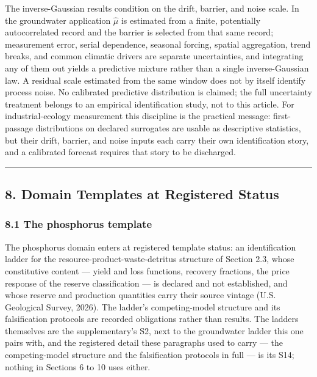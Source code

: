 \documentclass[11pt]{article}
\begin{document}
The inverse-Gaussian results condition on the drift, barrier, and noise
scale. In the groundwater application \(\widehat\mu\) is estimated from
a finite, potentially autocorrelated record and the barrier is selected
from that same record; measurement error, serial dependence, seasonal
forcing, spatial aggregation, trend breaks, and common climatic drivers
are separate uncertainties, and integrating any of them out yields a
predictive mixture rather than a single inverse-Gaussian law. A residual
scale estimated from the same window does not by itself identify process
noise. No calibrated predictive distribution is claimed; the full
uncertainty treatment belongs to an empirical identification study, not
to this article. For industrial-ecology measurement this discipline is
the practical message: first-passage distributions on declared
surrogates are usable as descriptive statistics, but their drift,
barrier, and noise inputs each carry their own identification story, and
a calibrated forecast requires that story to be discharged.

\begin{center}\rule{0.5\linewidth}{0.5pt}\end{center}

\subsection{8. Domain Templates at Registered
Status}\label{domain-templates-at-registered-status}

\subsubsection{8.1 The phosphorus
template}\label{the-phosphorus-template}

The phosphorus domain enters at registered template status: an identification ladder for the
resource-product-waste-detritus structure of Section 2.3, whose constitutive content --- yield and loss
functions, recovery fractions, the price response of the reserve classification --- is declared and not
established, and whose reserve and production quantities carry their source vintage (U.S. Geological Survey,
2026). The ladder's competing-model structure and its falsification protocols are recorded obligations rather
than results. The ladders themselves are the supplementary's S2, next to the groundwater ladder this one pairs
with, and the registered detail these paragraphs used to carry --- the competing-model structure and the
falsification protocols in full --- is its S14; nothing in Sections 6 to 10 uses either.
\end{document}
